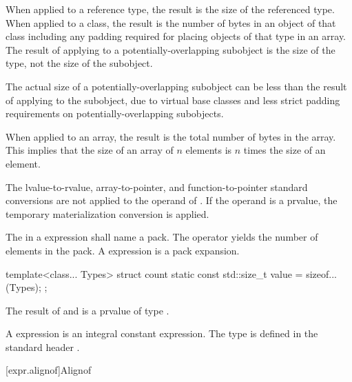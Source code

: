 \pnum
{}%
When applied to a reference type, the result is the size
of the referenced type.
%
When applied to a class, the result is the number of bytes in an object
of that class including any padding required for placing objects of that
type in an array.
The result of applying  to a
potentially-overlapping subobject is
the size of the type, not the size of the subobject.
\begin{footnote}
The actual size of a potentially-overlapping subobject
can be less than the result of
applying  to the subobject, due to virtual base classes
and less strict padding requirements on potentially-overlapping subobjects.
\end{footnote}
%
When applied to an array, the result is the total number of bytes in the
array. This implies that the size of an array of $n$ elements is
$n$ times the size of an element.

\pnum
The lvalue-to-rvalue,
array-to-pointer, and
function-to-pointer standard conversions are not
applied to the operand of .
If the operand is a prvalue,
the temporary materialization conversion
is applied.

\pnum
The  in a  expression shall name a
pack. The  operator yields the number of elements
in the pack.
A  expression is a pack expansion.
\begin{example}
\begin{codeblock}
template<class... Types>
struct count {
  static const std::size_t value = sizeof...(Types);
};
\end{codeblock}
\end{example}

\pnum
{}%
%
The result of  and  is a prvalue of type
.
\begin{note}
A  expression
is an integral constant expression.
The type  is defined in the standard header
.
\end{note}

[expr.alignof]{Alignof}

